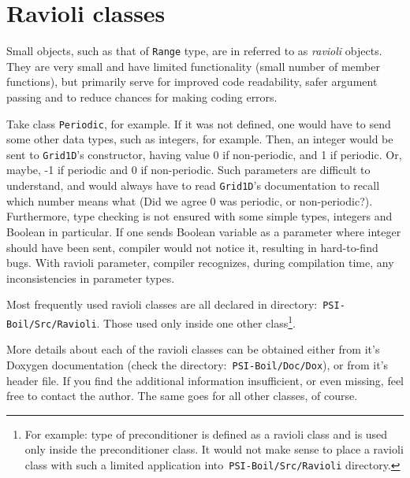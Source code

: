 \section{Ravioli classes}
\label{sec_ravioli}

Small objects, such as that of {\tt Range} type, are in {\psiboil} referred to 
as {\em ravioli} objects. They are very small and have limited functionality 
(small number of member functions), but primarily serve for improved code readability, 
safer argument passing and to reduce chances for making coding errors. 

Take class {\tt Periodic}, for example. If it was not defined, one would have
to send some other data types, such as integers, for example. Then, an
integer would be sent to {\tt Grid1D}'s constructor, having value 0 if non-periodic,
and 1 if periodic. Or, maybe, -1 if periodic and 0 if non-periodic. Such
parameters are difficult to understand, and would always have to read 
{\tt Grid1D}'s documentation to recall which number means what (Did we agree
0 was periodic, or non-periodic?). Furthermore, type checking is not ensured
with some simple types, integers and Boolean in particular. If one sends
Boolean variable as a parameter where integer should have been sent, compiler
would not notice it, resulting in hard-to-find bugs. With ravioli parameter,
compiler recognizes, during compilation time, any inconsistencies in parameter
types.  

Most frequently used ravioli classes are all declared in 
directory:~{\tt PSI-Boil/Src/Ravioli}. Those used only inside one other 
class\footnote{For example: type of preconditioner is defined as a ravioli class and is
used only inside the preconditioner class. It would not make sense to place a ravioli
class with such a limited application into~{\tt PSI-Boil/Src/Ravioli} directory.}.

More details about each of the ravioli classes can be obtained either from
it's Doxygen documentation (check the directory:~{\tt PSI-Boil/Doc/Dox}), or
from it's header file. If you find the additional information insufficient,
or even missing, feel free to contact the author. The same goes for all other
classes, of course.

